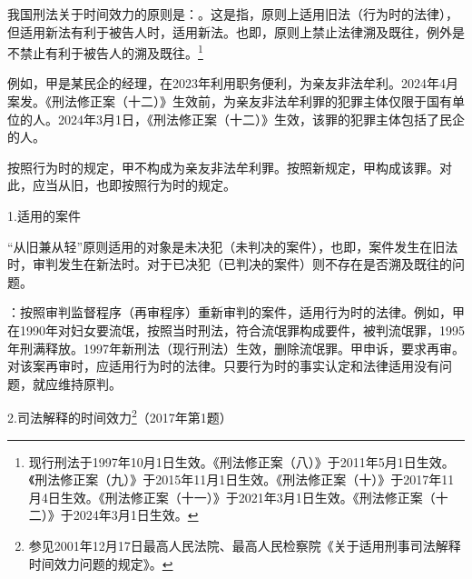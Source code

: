 
我国刑法关于时间效力的原则是：。这是指，原则上适用旧法（行为时的法律），但适用新法有利于被告人时，适用新法。也即，原则上禁止法律溯及既往，例外是不禁止有利于被告人的溯及既往。\footnote{现行刑法于1997年10月1日生效。《刑法修正案（八）》于2011年5月1日生效。《刑法修正案（九）》于2015年11月1日生效。《刑法修正案（十）》于2017年11月4日生效。《刑法修正案（十一）》于2021年3月1日生效。《刑法修正案（十二）》于2024年3月1日生效。}

例如，甲是某民企的经理，在2023年利用职务便利，为亲友非法牟利。2024年4月案发。《刑法修正案（十二）》生效前，为亲友非法牟利罪的犯罪主体仅限于国有单位的人。2024年3月1日，《刑法修正案（十二）》生效，该罪的犯罪主体包括了民企的人。

按照行为时的规定，甲不构成为亲友非法牟利罪。按照新规定，甲构成该罪。对此，应当从旧，也即按照行为时的规定。

1.适用的案件

“从旧兼从轻”原则适用的对象是未决犯（未判决的案件），也即，案件发生在旧法时，审判发生在新法时。对于已决犯（已判决的案件）则不存在是否溯及既往的问题。

：按照审判监督程序（再审程序）重新审判的案件，适用行为时的法律。例如，甲在1990年对妇女要流氓，按照当时刑法，符合流氓罪构成要件，被判流氓罪，1995年刑满释放。1997年新刑法（现行刑法）生效，删除流氓罪。甲申诉，要求再审。对该案再审时，应适用行为时的法律。只要行为时的事实认定和法律适用没有问题，就应维持原判。

2.司法解释的时间效力\footnote{参见2001年12月17日最高人民法院、最高人民检察院《关于适用刑事司法解释时间效力问题的规定》。}（2017年第1题）


